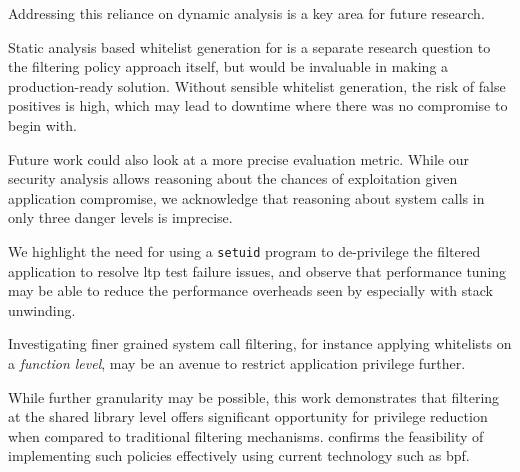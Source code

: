 Addressing this reliance on dynamic analysis is a key area for future research.

Static analysis based whitelist generation for \af is a separate research
question to the filtering policy approach itself, but would be invaluable in
making \af a production-ready solution. Without sensible whitelist generation,
the risk of false positives is high, which may lead to downtime where there was
no compromise to begin with.

Future work could also look at a more precise evaluation metric. While our
security analysis allows reasoning about the chances of exploitation given
application compromise, we acknowledge that reasoning about system calls in
only three danger levels is imprecise. 

We highlight the need for using a \texttt{setuid} program to de-privilege
the filtered application to resolve \ac{ltp} test failure issues, and observe
that performance tuning may be able to reduce the performance overheads seen by
\af especially with stack unwinding.

Investigating finer grained system call filtering, for instance applying
whitelists on a \textit{function level}, may be an avenue to restrict
application privilege further.

While further granularity may be possible, this work demonstrates that
filtering at the shared library level  offers significant opportunity for
privilege reduction when compared to traditional filtering mechanisms. \af
confirms the feasibility of implementing such policies effectively using
current technology such as \ac{bpf}. 
